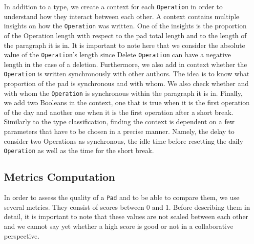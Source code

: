 \documentclass[a4, twocolumn, 12pt]{article}
\begin{document}
In addition to a type, we create a context for each \texttt{Operation} in order to understand how they interact between each other. A context contains multiple insights on how the \texttt{Operation} was written. One of the insights is the proportion of the Operation length with respect to the pad total length and to the length of the paragraph it is in. It is important to note here that we consider the absolute value of the \texttt{Operation}’s length since Delete \texttt{Operation} can have a negative length in the case of a deletion. Furthermore, we also add in context whether the \texttt{Operation} is written synchronously with other authors. The idea is to know what proportion of the pad is synchronous and with whom. We also check whether and with whom the \texttt{Operation} is synchronous within the paragraph it is in. Finally, we add two Booleans in the context, one that is true when it is the first operation of the day and another one when it is the first operation after a short break. Similarly to the type classification, finding the context is dependent on a  few parameters that have to be chosen in a precise manner. Namely, the delay to consider two Operations as synchronous, the idle time before resetting the daily \texttt{Operation} as well as the time for the short break.


\subsection{Metrics Computation}

In order to assess the quality of a \texttt{Pad} and to be able to compare them, we use several metrics. They consist of scores between 0 and 1. Before describing them in detail, it is important to note that these values are not scaled between each other and we cannot say yet whether a high score is good or not in a collaborative perspective.
\end{document}
